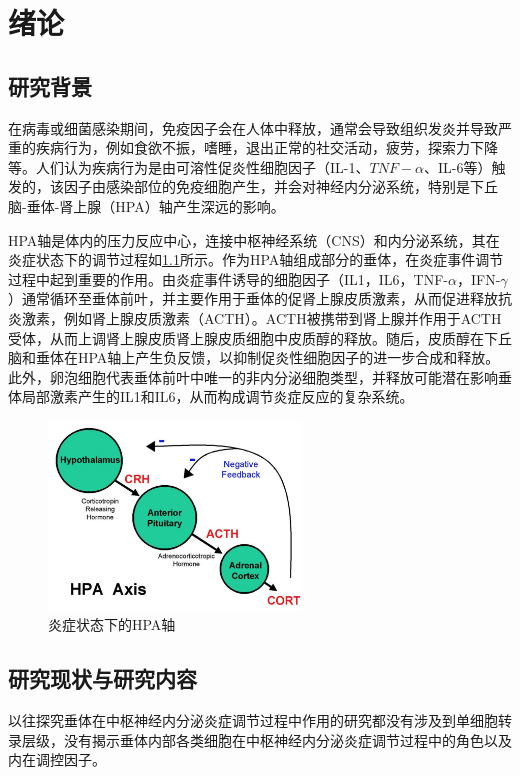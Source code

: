 
\chapter{绪论}
\section{研究背景}
  在病毒或细菌感染期间，免疫因子会在人体中释放，通常会导致组织发炎并导致严重的疾病行为，例如食欲不振，嗜睡，退出正常的社交活动，疲劳，探索力下降等。人们认为疾病行为是由可溶性促炎性细胞因子（IL-1、$TNF-\alpha$、IL-6等）触发的，该因子由感染部位的免疫细胞产生，并会对神经内分泌系统，特别是下丘脑-垂体-肾上腺（HPA）轴\cite{chrousos1995hypothalamic,shanks2000early}产生深远的影响。

  HPA轴是体内的压力反应中心，连接中枢神经系统（CNS）和内分泌系统，其在炎症状态下的调节过程如\ref{fig:HPA}所示。作为HPA轴组成部分的垂体，在炎症事件调节过程中起到重要的作用。由炎症事件诱导的细胞因子（IL1，IL6，TNF-$\alpha$，IFN-$\gamma$）通常循环至垂体前叶，并主要作用于垂体的促肾上腺皮质激素，从而促进释放抗炎激素，例如肾上腺皮质激素（ACTH）。ACTH被携带到肾上腺并作用于ACTH受体，从而上调肾上腺皮质肾上腺皮质细胞中皮质醇的释放。随后，皮质醇在下丘脑和垂体在HPA轴上产生负反馈，以抑制促炎性细胞因子的进一步合成和释放。此外，卵泡细胞代表垂体前叶中唯一的非内分泌细胞类型，并释放可能潜在影响垂体局部激素产生的IL1和IL6，从而构成调节炎症反应的复杂系统。

\begin{figure}[!htb]
  \centering
  \includegraphics[width=0.6\textwidth]{figs/HPA.png}
  \caption{炎症状态下的HPA轴}
  \label{fig:HPA}
\end{figure}

\section{研究现状与研究内容}
  以往探究垂体在中枢神经内分泌炎症调节过程中作用的研究\cite{chrousos1995hypothalamic,shanks2000early}都没有涉及到单细胞转录层级，没有揭示垂体内部各类细胞在中枢神经内分泌炎症调节过程中的角色以及内在调控因子。

